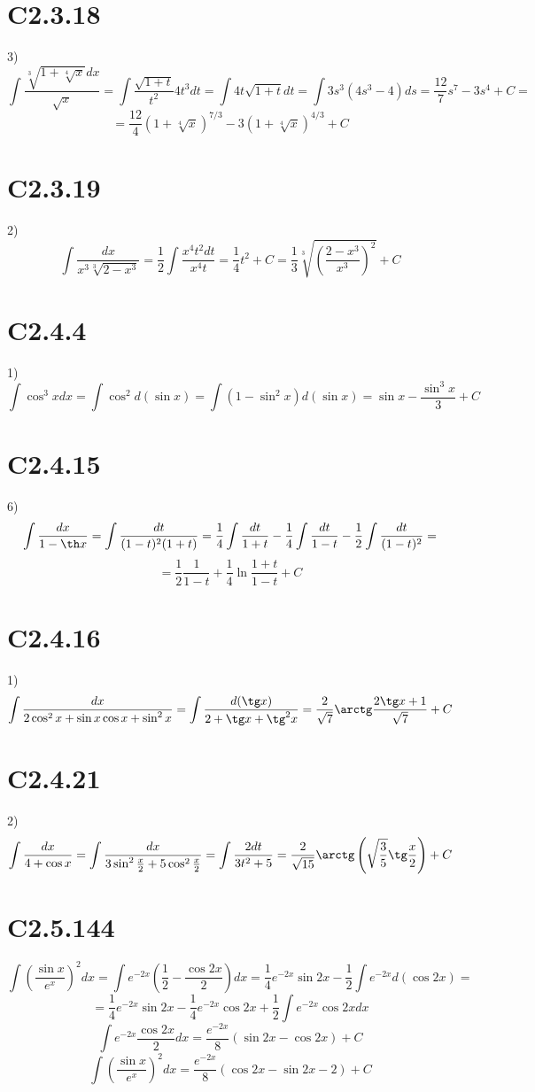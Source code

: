 \documentclass[a4paper,12pt]{article} %
\begin{document}
\section*{C2.3.18}3)$$\int\frac{\sqrt[3]{1+\sqrt[4]{x}}dx}{\sqrt{x}}=\int\frac{\sqrt{1+t}}{t^2}4t^3dt=\int4t\sqrt{1+t}dt=\int3s^3(4s^3-4)ds=\frac{12}{7}s^7-3s^4+C=$$
$$=\frac{12}{4}(1+\sqrt[4]{x})^{7/3}-3(1+\sqrt[4]{x})^{4/3}+C$$
\section*{C2.3.19}2)$$\int\frac{dx}{x^3\sqrt[3]{2-x^3}}=\frac{1}{2}\int\frac{x^4t^2dt}{x^4t}=\frac{1}{4}t^2+C=\frac{1}{3}\sqrt[3]{\left(\frac{2-x^3}{x^3}\right)^2}+C$$
\section*{C2.4.4}1)$$\int\cos^3xdx=\int\cos^2d(\sin x)=\int(1-\sin^2x)d(\sin x)=\sin x-\frac{\sin^3x}{3}+C$$
\section*{C2.4.15}6)$$\int\frac{dx}{1-\th x}=\int\frac{dt}{(1-t)^2(1+t)}=\frac{1}{4}\int\frac{dt}{1+t}-\frac{1}{4}\int\frac{dt}{1-t}-\frac{1}{2}\int\frac{dt}{(1-t)^2}=$$
$$=\frac{1}{2}\frac{1}{1-t}+\frac{1}{4}\ln\frac{1+t}{1-t}+C$$
\section*{C2.4.16}1)$$\int\frac{dx}{2\cos^2x+\sin x\cos x+\sin^2x}=\int\frac{d(\tg x)}{2+\tg x+\tg^2x}=\frac{2}{\sqrt{7}}\arctg\frac{2\tg x+1}{\sqrt{7}}+C$$
\section*{C2.4.21}2)$$\int\frac{dx}{4+\cos x}=\int\frac{dx}{3\sin^2\frac{x}{2}+5\cos^2\frac{x}{2}}=\int\frac{2dt}{3t^2+5}=\frac{2}{\sqrt{15}}\arctg\left(\sqrt{\frac{3}{5}}\tg\frac{x}{2}\right)+C$$
\section*{C2.5.144}$$\int\left(\frac{\sin x}{e^{x}}\right)^2dx=\int e^{-2x}\left(\frac{1}{2}-\frac{\cos 2x}{2}\right)dx=\frac{1}{4}e^{-2x}\sin 2x-\frac{1}{2}\int e^{-2x}d(\cos2x)=$$
$$=\frac{1}{4}e^{-2x}\sin 2x-\frac{1}{4}e^{-2x}\cos 2x+\frac{1}{2}\int e^{-2x}\cos2xdx$$
$$\int e^{-2x}\frac{\cos 2x}{2}dx=\frac{e^{-2x}}{8}\left(\sin 2x-\cos 2x\right)+C$$
$$\int\left(\frac{\sin x}{e^{x}}\right)^2dx=\frac{e^{-2x}}{8}\left(\cos 2x-\sin 2x-2\right)+C$$
\end{document}
